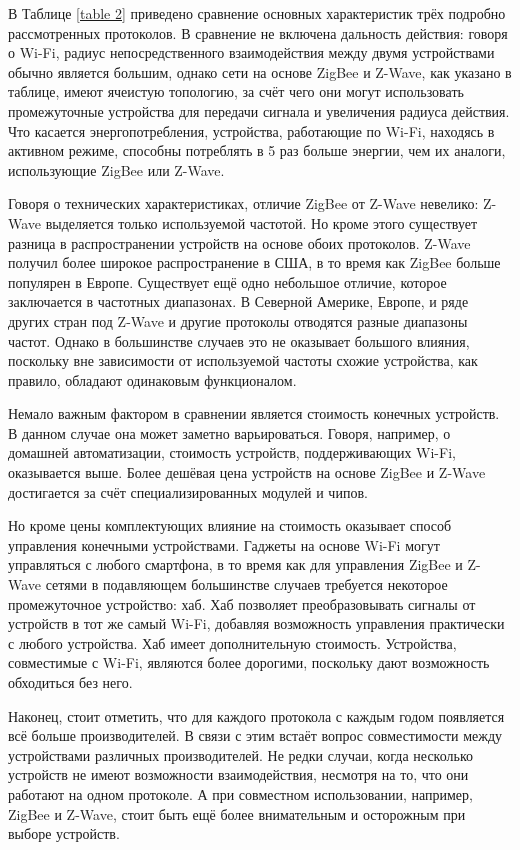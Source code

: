 	В Таблице \ref{table 2} приведено сравнение основных характеристик трёх подробно рассмотренных
	протоколов. В сравнение не включена дальность действия: говоря о Wi-Fi, радиус непосредственного
	взаимодействия между двумя устройствами обычно является большим, однако сети на основе
	ZigBee и Z-Wave, как указано в таблице, имеют ячеистую топологию, за счёт чего они могут использовать
	промежуточные устройства для передачи сигнала и увеличения радиуса действия. Что касается 
	энергопотребления, устройства, работающие по Wi-Fi, находясь в активном режиме, способны потреблять
	в 5 раз больше энергии, чем их аналоги, использующие ZigBee или Z-Wave.
	
	Говоря о технических характеристиках, отличие ZigBee от Z-Wave невелико: Z-Wave выделяется только
	используемой частотой. Но кроме этого существует разница в распространении устройств на основе
	обоих протоколов. Z-Wave получил более широкое распространение в США, в то время как ZigBee больше
	популярен в Европе. Существует ещё одно небольшое отличие, которое заключается в частотных диапазонах. 
	В Северной Америке, 
	Европе, и ряде других стран под Z-Wave и другие протоколы отводятся разные диапазоны частот. Однако
	в большинстве случаев это не оказывает большого влияния, поскольку вне зависимости от используемой 
	частоты схожие устройства, как правило, обладают одинаковым функционалом.
	
	Немало важным фактором в сравнении является стоимость конечных устройств. В данном случае она может
	заметно варьироваться. Говоря, например, о домашней автоматизации, стоимость устройств, поддерживающих
	Wi-Fi, оказывается выше. Более дешёвая цена устройств на основе ZigBee и Z-Wave достигается
	за счёт специализированных модулей и чипов.
	
	Но кроме цены комплектующих влияние на стоимость оказывает способ управления конечными устройствами.
	Гаджеты на основе Wi-Fi могут управляться с любого смартфона, в то время как для управления ZigBee и Z-Wave
	сетями в подавляющем большинстве случаев требуется некоторое промежуточное устройство: хаб. Хаб
	позволяет преобразовывать сигналы от устройств в тот же самый Wi-Fi, добавляя возможность управления
	практически с любого устройства. Хаб имеет дополнительную стоимость. Устройства, совместимые с  Wi-Fi,
	являются более дорогими, поскольку дают возможность обходиться без него.
	
	Наконец, стоит отметить, что для каждого протокола с каждым годом появляется всё больше производителей.
	В связи с этим встаёт вопрос совместимости между устройствами различных производителей. Не редки случаи,
	когда несколько устройств не имеют возможности взаимодействия, несмотря на то, что они работают
	на одном протоколе. А при совместном использовании, например, ZigBee и Z-Wave, стоит быть ещё более
	внимательным и осторожным при выборе устройств.
